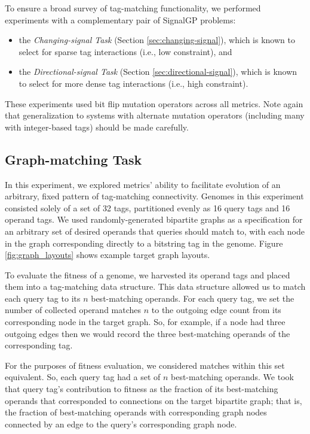 To ensure a broad survey of tag-matching functionality, we performed experiments with a complementary pair of SignalGP problems:
\begin{itemize}
    \item the \textit{Changing-signal Task} (Section \ref{sec:changing-signal}), which is known to select for sparse tag interactions (i.e., low constraint), and
    \item the \textit{Directional-signal Task} (Section \ref{sec:directional-signal}), which is known to select for more dense tag interactions (i.e., high constraint).
\end{itemize}

These experiments used bit flip mutation operators across all metrics.
Note again that generalization to systems with alternate mutation operators (including many with integer-based tags) should be made carefully.

\subsection{Graph-matching Task} \label{sec:graph-matching}





In this experiment, we explored metrics' ability to facilitate evolution of an arbitrary, fixed pattern of tag-matching connectivity.
Genomes in this experiment consisted solely of a set of 32 tags, partitioned evenly as 16 query tags and 16 operand tags.
We used randomly-generated bipartite graphs as a specification for an arbitrary set of desired operands that queries should match to, with each node in the graph corresponding directly to a bitstring tag in the genome.
Figure \ref{fig:graph_layouts} shows example target graph layouts.

To evaluate the fitness of a genome, we harvested its operand tags and placed them into a tag-matching data structure.
This data structure allowed us to match each query tag to its $n$ best-matching operands.
For each query tag, we set the number of collected operand matches $n$ to the outgoing edge count from its corresponding node in the target graph.
So, for example, if a node had three outgoing edges then we would record the three best-matching operands of the corresponding tag.

For the purposes of fitness evaluation, we considered matches within this set equivalent.
So, each query tag had a set of $n$ best-matching operands.
We took that query tag's contribution to fitness as the fraction of its best-matching operands that corresponded to connections on the target bipartite graph; that is, the fraction of best-matching operands with corresponding graph nodes connected by an edge to the query's corresponding graph node.

